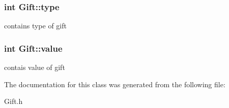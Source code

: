 \subsubsection[{\texorpdfstring{type}{type}}]{\setlength{\rightskip}{0pt plus 5cm}int Gift\+::type}\hypertarget{classGift_a63fb63fdc6f0821417039da90a54ad4c}{}\label{classGift_a63fb63fdc6f0821417039da90a54ad4c}
contains type of gift 
\subsubsection[{\texorpdfstring{value}{value}}]{\setlength{\rightskip}{0pt plus 5cm}int Gift\+::value}\hypertarget{classGift_a71d14b92ebfd06993afe584f088bc748}{}\label{classGift_a71d14b92ebfd06993afe584f088bc748}
contais value of gift 

The documentation for this class was generated from the following file\+:\begin{DoxyCompactItemize}
\item 
Gift.\+h\end{DoxyCompactItemize}
